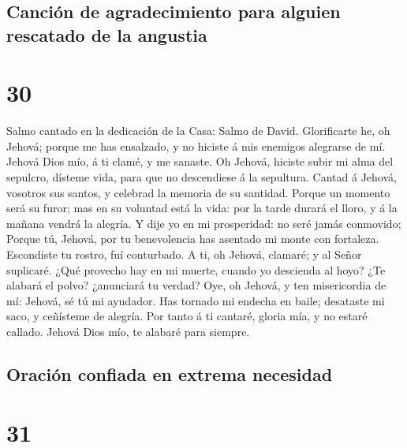 \hypertarget{canciuxf3n-de-agradecimiento-para-alguien-rescatado-de-la-angustia}{%
\subsection{Canción de agradecimiento para alguien rescatado de la
angustia}\label{canciuxf3n-de-agradecimiento-para-alguien-rescatado-de-la-angustia}}

\hypertarget{section-29}{%
\section{30}\label{section-29}}

 Salmo cantado en la dedicación de la Casa: Salmo de
David. Glorificarte he, oh Jehová; porque me has ensalzado, y no hiciste
á mis enemigos alegrarse de mí.  Jehová Dios mío, á ti
clamé, y me sanaste.  Oh Jehová, hiciste subir mi alma del
sepulcro, dísteme vida, para que no descendiese á la sepultura.
 Cantad á Jehová, vosotros sus santos, y celebrad la
memoria de su santidad.  Porque un momento será su furor;
mas en su voluntad está la vida: por la tarde durará el lloro, y á la
mañana vendrá la alegría.  Y dije yo en mi prosperidad: no
seré jamás conmovido;  Porque tú, Jehová, por tu
benevolencia has asentado mi monte con fortaleza. Escondiste tu rostro,
fuí conturbado.  A ti, oh Jehová, clamaré; y al Señor
suplicaré.  ¿Qué provecho hay en mi muerte, cuando yo
descienda al hoyo? ¿Te alabará el polvo? ¿anunciará tu verdad?
 Oye, oh Jehová, y ten misericordia de mí: Jehová, sé tú
mi ayudador.  Has tornado mi endecha en baile; desataste
mi saco, y ceñísteme de alegría.  Por tanto á ti cantaré,
gloria mía, y no estaré callado. Jehová Dios mío, te alabaré para
siempre.

\hypertarget{oraciuxf3n-confiada-en-extrema-necesidad}{%
\subsection{Oración confiada en extrema
necesidad}\label{oraciuxf3n-confiada-en-extrema-necesidad}}

\hypertarget{section-30}{%
\section{31}\label{section-30}}

